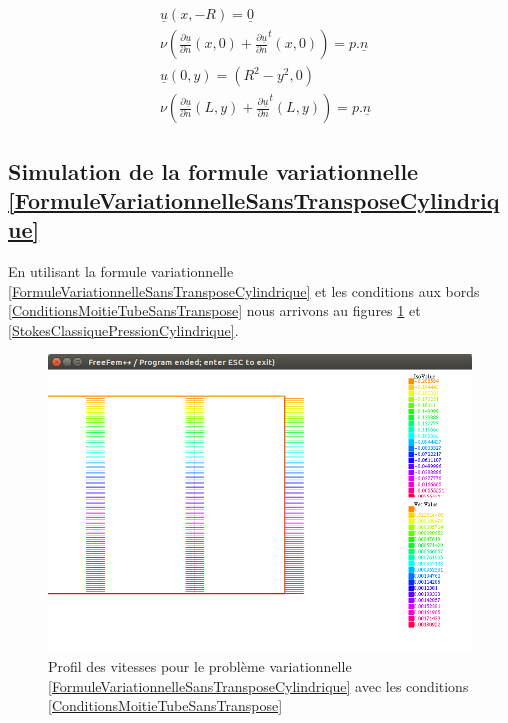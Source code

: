 \documentclass[11pt,a4paper]{article}
\numberwithin{equation}{subsection}
\numberwithin{figure}{subsection}
\begin{document}
\begin{equation}
\begin{aligned}
& \underline{u}(x,-R) = \underline{0} \\
& \nu\left(\frac{\partial\underline{u}}{\partial n}(x,0) + \frac{\partial\underline{u}}{\partial n}^t(x,0)\right) = p.\underline{n} \\
& \underline{u}(0,y) = \left(R^2 - y^2, 0\right) \\
& \nu\left(\frac{\partial\underline{u}}{\partial n}(L,y) + \frac{\partial\underline{u}}{\partial n}^t(L,y)\right) = p.\underline{n}
\end{aligned} \label{ConditionsMoitieTubeAvecTranspose}
\end{equation}

\subsection{Simulation de la formule variationnelle \ref{FormuleVariationnelleSansTransposeCylindrique}}

En utilisant la formule variationnelle \ref{FormuleVariationnelleSansTransposeCylindrique} et les conditions aux bords \ref{ConditionsMoitieTubeSansTranspose} nous arrivons au figures \ref{StokesClassiqueVitessesCylindrique} et \ref{StokesClassiquePressionCylindrique}.

\begin{figure}
\centering
\includegraphics[scale=0.4]{StokesClassiqueVitessesCylindrique.png}
\caption{Profil des vitesses pour le problème variationnelle \ref{FormuleVariationnelleSansTransposeCylindrique} avec les conditions \ref{ConditionsMoitieTubeSansTranspose}}
\label{StokesClassiqueVitessesCylindrique}
\end{figure}
\end{document}
